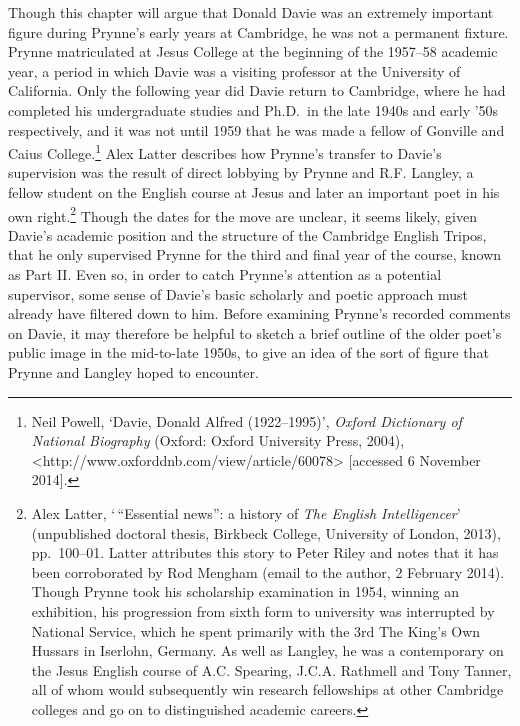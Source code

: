 \documentclass[]{article}
\begin{document}
Though this chapter will argue that Donald Davie was an extremely
important figure during Prynne's early years at Cambridge, he was not a
permanent fixture. Prynne matriculated at Jesus College at the beginning
of the 1957--58 academic year, a period in which Davie was a visiting
professor at the University of California. Only the following year did
Davie return to Cambridge, where he had completed his undergraduate
studies and Ph.D.~in the late 1940s and early '50s respectively, and it
was not until 1959 that he was made a fellow of Gonville and Caius
College.\footnote{Neil Powell, `Davie, Donald Alfred (1922--1995)',
  \emph{Oxford Dictionary of National Biography} (Oxford: Oxford
  University Press, 2004),
  \textless{}http://www.oxforddnb.com/view/article/60078\textgreater{}
  {[}accessed 6 November 2014{]}.} Alex Latter describes how Prynne's
transfer to Davie's supervision was the result of direct lobbying by
Prynne and R.F. Langley, a fellow student on the English course at Jesus
and later an important poet in his own right.\footnote{Alex Latter,
  `\,``Essential news'': a history of \emph{The English Intelligencer}'
  (unpublished doctoral thesis, Birkbeck College, University of London,
  2013), pp.~100--01. Latter attributes this story to Peter Riley and
  notes that it has been corroborated by Rod Mengham (email to the
  author, 2 February 2014). Though Prynne took his scholarship
  examination in 1954, winning an exhibition, his progression from sixth
  form to university was interrupted by National Service, which he spent
  primarily with the 3rd The King's Own Hussars in Iserlohn, Germany. As
  well as Langley, he was a contemporary on the Jesus English course of
  A.C. Spearing, J.C.A. Rathmell and Tony Tanner, all of whom would
  subsequently win research fellowships at other Cambridge colleges and
  go on to distinguished academic careers.} Though the dates for the
move are unclear, it seems likely, given Davie's academic position and
the structure of the Cambridge English Tripos, that he only supervised
Prynne for the third and final year of the course, known as Part II.
Even so, in order to catch Prynne's attention as a potential supervisor,
some sense of Davie's basic scholarly and poetic approach must already
have filtered down to him. Before examining Prynne's recorded comments
on Davie, it may therefore be helpful to sketch a brief outline of the
older poet's public image in the mid-to-late 1950s, to give an idea of
the sort of figure that Prynne and Langley hoped to encounter.
\end{document}

